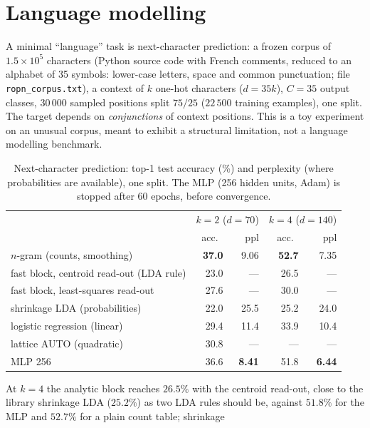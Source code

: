 \documentclass[11pt,a4paper]{article}
\theoremstyle{plain}
\theoremstyle{definition}
\theoremstyle{remark}
\begin{document}
\section{Language modelling}
\label{sec:lm}
A minimal ``language'' task is next-character prediction: a frozen corpus
of $1.5\times10^5$ characters (Python source code with French comments,
reduced to an alphabet of 35 symbols: lower-case letters, space and common
punctuation; file \texttt{ropn\_corpus.txt}), a context of $k$ one-hot
characters ($d=35k$), $C=35$ output classes, $30\,000$ sampled positions
split $75/25$ ($22\,500$ training examples), one split. The target depends on
\emph{conjunctions} of context positions. This is a toy experiment on an
unusual corpus, meant to exhibit a structural limitation, not a language
modelling benchmark.
\begin{table}[h]
\centering\small\renewcommand{\arraystretch}{1.12}
\caption{Next-character prediction: top-1 test accuracy (\%) and perplexity (where probabilities are available), one split. The MLP (256 hidden units, Adam) is stopped after 60 epochs, before convergence.}
\label{tab:charlm}
\begin{tabular}{@{}lrrrr@{}}
\toprule
 & \multicolumn{2}{c}{$k=2$ ($d=70$)} & \multicolumn{2}{c}{$k=4$ ($d=140$)} \\
 & acc.\ & ppl & acc.\ & ppl \\
\midrule
$n$-gram (counts, smoothing) & \textbf{37.0} & 9.06 & \textbf{52.7} & 7.35 \\
fast block, centroid read-out (LDA rule) & 23.0 & --- & 26.5 & --- \\
fast block, least-squares read-out & 27.6 & --- & 30.0 & --- \\
shrinkage LDA (probabilities) & 22.0 & 25.5 & 25.2 & 24.0 \\
logistic regression (linear) & 29.4 & 11.4 & 33.9 & 10.4 \\
lattice AUTO (quadratic) & 30.8 & --- & --- & --- \\
MLP 256 & 36.6 & \textbf{8.41} & 51.8 & \textbf{6.44} \\
\bottomrule
\end{tabular}
\end{table}
At $k=4$ the analytic block reaches $26.5\%$ with the centroid read-out,
close to the library shrinkage LDA ($25.2\%$) as two LDA rules should be,
against $51.8\%$ for the MLP and $52.7\%$ for a plain count table; shrinkage
\end{document}
